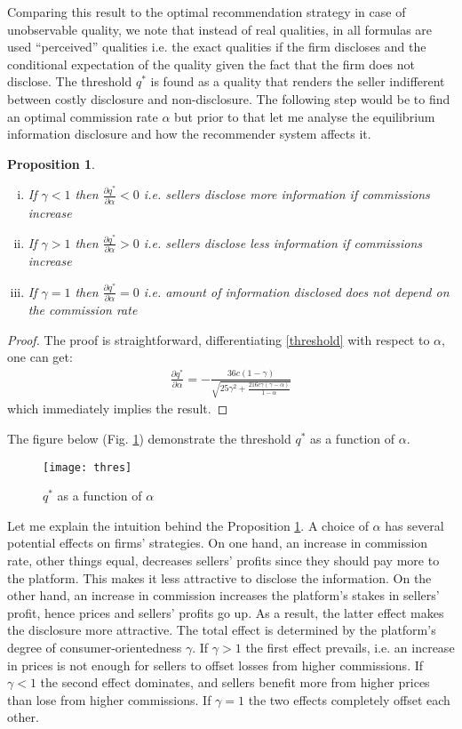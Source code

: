 \documentclass[a4paper]{article}
\newtheorem{proposition}[theorem]{Proposition}
\begin{document}
Comparing this result to the optimal recommendation strategy in case of unobservable quality, we note that instead of real qualities, in all formulas are used ``perceived'' qualities i.e. the exact qualities if the firm discloses and the conditional expectation of the quality given the fact that the firm does not disclose. The threshold $q^*$ is found as a quality that renders the seller indifferent between costly disclosure and non-disclosure. The following step would be to find an optimal commission rate $\alpha$ but prior to that let me analyse the equilibrium information disclosure and how the recommender system affects it.
\begin{proposition}\label{thres}
	\begin{enumerate}[(i)]
		\item If $\gamma <1$ then $\frac{\partial q^*}{\partial \alpha} < 0$ i.e. sellers disclose more information if commissions increase
		\item If $\gamma > 1$ then $\frac{\partial q^*}{\partial \alpha} > 0$ i.e. sellers disclose less information if commissions increase
		\item If $\gamma = 1$ then $\frac{\partial q^*}{\partial \alpha} = 0$ i.e. amount of information disclosed does not depend on the commission rate
	\end{enumerate}
\end{proposition}
\begin{proof}
	The proof is straightforward, differentiating \eqref{threshold} with respect to $\alpha$, one can get:
	\begin{align*}
	\frac{\partial q^*}{\partial \alpha} = - \frac{36 c (1-\gamma)}{\sqrt{25 \gamma^2 + \frac{216 c \gamma (\gamma - \alpha)}{1 - \alpha}}} 
	\end{align*}
	which immediately implies the result.
\end{proof}
The figure below (Fig. \ref{fig2}) demonstrate the threshold $q^*$ as a function of $\alpha$.
	\begin{figure}[H]
	\centering
	\texttt{[image: thres]}
	\caption{$q^*$ as a function of $\alpha$}\label{fig2}
\end{figure}


Let me explain the intuition behind the Proposition \ref{thres}. A choice of $\alpha$ has several potential effects on firms' strategies. On one hand, an increase in commission rate, other things equal, decreases sellers' profits since they should pay more to the platform. This makes it less attractive to disclose the information. On the other hand, an increase in commission increases the platform's stakes in sellers' profit, hence prices and sellers' profits go up. As a result, the latter effect makes the disclosure more attractive. The total effect is determined by the platform's degree of consumer-orientedness $\gamma$. If $\gamma > 1$ the first effect prevails, i.e. an increase in prices is not enough for sellers to offset losses from higher commissions. If $\gamma < 1$ the second effect dominates, and sellers benefit more from higher prices than lose from higher commissions. If $\gamma = 1$ the two effects completely offset each other.
\end{document}
